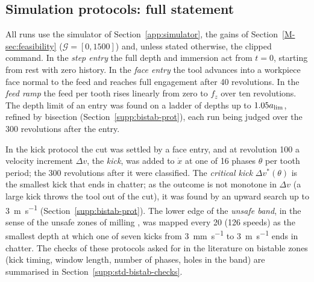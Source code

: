 
\subsection{Simulation protocols: full statement}\label{supp:std-bistab-prot}

All runs use the simulator of Section~\ref{app:simulator}, the gains of Section~\ref{M-sec:feasibility} ($\mathcal G=[0,1500]$) and, unless stated otherwise, the clipped command. In the \emph{step entry} the full depth and immersion act from $t=0$, starting from rest with zero history. In the \emph{face entry} the tool advances into a workpiece face normal to the feed and reaches full engagement after 40 revolutions. In the \emph{feed ramp} the feed per tooth rises linearly from zero to $f_z$ over ten revolutions. The depth limit of an entry was found on a ladder of depths up to $1.05a_{\lim}$, refined by bisection (Section~\ref{supp:bistab-prot}), each run being judged over the 300 revolutions after the entry.

In the kick protocol the cut was settled by a face entry, and at revolution 100 a velocity increment $\Delta v$, the \emph{kick}, was added to $\dot x$ at one of 16 phases $\theta$ per tooth period; the 300 revolutions after it were classified. The \emph{critical kick} $\Delta v^*(\theta)$ is the smallest kick that ends in chatter; as the outcome is not monotone in $\Delta v$ (a large kick throws the tool out of the cut), it was found by an upward search up to \SI{3}{\metre\per\second} (Section~\ref{supp:bistab-prot}). The lower edge of the \emph{unsafe band}, in the sense of the unsafe zones of milling \citep{dombovari2015bistable,dombovari2019experimental}, was mapped every \SI{20}{\rpm} (126 speeds) as the smallest depth at which one of seven kicks from \SI{3}{\milli\metre\per\second} to \SI{3}{\metre\per\second} ends in chatter. The checks of these protocols asked for in the literature on bistable zones (kick timing, window length, number of phases, holes in the band) are summarised in Section~\ref{supp:std-bistab-checks}.

